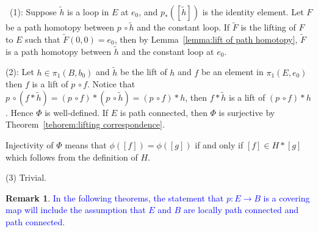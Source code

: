 \documentclass[12pt,a4paper]{book}
\newenvironment{prooff}{{\noindent\it\textcolor{cyan!40!black}{Proof}:}\,}{\par}
\newcommand{\blue}[1]{\textcolor{blue}{#1}}
\theoremstyle{definition}
\newtheorem{rema}[defn]{Remark}
\begin{document}
\begin{prooff}
    (1): Suppose $\tilde{h}$ is a loop in $E$ at $e_0$, and $p_*([\tilde{h}])$ is the identity element. Let $F$ be a path homotopy between $p\,\circ \tilde{h}$ and the constant loop. If $\tilde{F}$ is the lifting of $F$ to $E$ such that $\tilde{F}(0,0)=e_0$, then by Lemma~\ref{lemma:lift of path homotopy}, $\tilde{F}$ is a path homotopy between $\tilde{h}$ and the constant loop at $e_0$.

    (2): Let $h\in \pi_1(B,b_0)$ and $\tilde{h}$ be the lift of $h$ and $f$ be an element in $\pi_1(E,e_0)$ then $f$ is a lift of $p\,\circ f$.
    Notice that $p\,\circ (f*\tilde{h})=(p\,\circ f) *(p\,\circ \tilde{h})=(p\,\circ f)* h$, then $f*\tilde{h} $ is a lift of $(p\,\circ f)*h$.
    Hence $\Phi$ is well-defined. If $E$ is path connected, then  $\Phi$ is surjective by Theorem~\ref{tehorem:lifting correspondence}.

    Injectivity of $\Phi$ means that $\phi([f])=\phi([g])$ if and only if $[f] \in H *[g]$ which follows from the definition of $H$.

    (3) Trivial.
\end{prooff}
\begin{rema}
    \blue{In the following theorems, the statement that $p: E \rightarrow B$ is a covering map will include the assumption that $E$ and $B$ are locally path connected and path connected}.
\end{rema}
\end{document}
